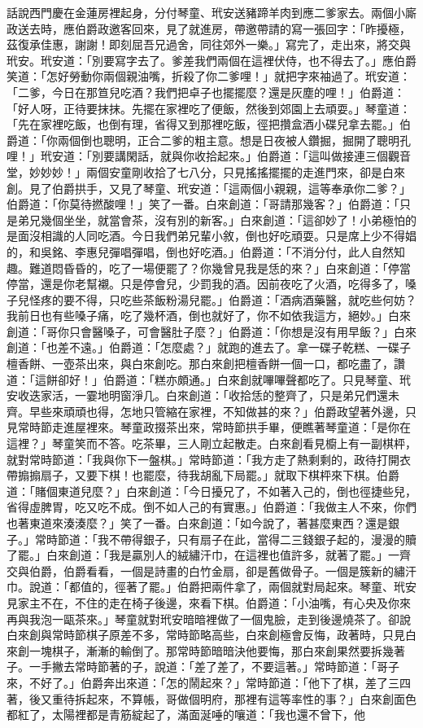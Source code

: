 \begin{showcontents}{}
話說西門慶在金蓮房裡起身，分付琴童、玳安送豬蹄羊肉到應二爹家去。兩個小廝政送去時，應伯爵政邀客回來，見了就進房，帶邀帶請的寫一張回字：「昨擾極，茲復承佳惠，謝謝！即刻屈吾兄過舍，同往郊外一樂。」寫完了，走出來，將交與玳安。玳安道：「別要寫字去了。爹差我們兩個在這裡伏侍，也不得去了。」應伯爵笑道：「怎好勞動你兩個親油嘴，折殺了你二爹哩！」就把字來袖過了。玳安道：「二爹，今日在那笪兒吃酒？我們把卓子也擺擺麼？還是灰塵的哩！」伯爵道：「好人呀，正待要抹抹。先擺在家裡吃了便飯，然後到郊園上去頑耍。」琴童道：「先在家裡吃飯，也倒有理，省得又到那裡吃飯，徑把攢盒酒小碟兒拿去罷。」伯爵道：「你兩個倒也聰明，正合二爹的粗主意。想是日夜被人鑽掘，掘開了聰明孔哩！」玳安道：「別要講閑話，就與你收拾起來。」伯爵道：「這叫做接連三個觀音堂，妙妙妙！」兩個安童剛收拾了七八分，只見搖搖擺擺的走進門來，卻是白來創。見了伯爵拱手，又見了琴童、玳安道：「這兩個小親親，這等奉承你二爹？」伯爵道：「你莫待撚酸哩！」笑了一番。白來創道：「哥請那幾客？」伯爵道：「只是弟兄幾個坐坐，就當會茶，沒有別的新客。」白來創道：「這卻妙了！小弟極怕的是面沒相識的人同吃酒。今日我們弟兄輩小敘，倒也好吃頑耍。只是席上少不得娼的，和吳銘、李惠兒彈唱彈唱，倒也好吃酒。」伯爵道：「不消分付，此人自然知趣。難道悶昏昏的，吃了一場便罷了？你幾曾見我是恁的來？」白來創道：「停當停當，還是你老幫襯。只是停會兒，少罰我的酒。因前夜吃了火酒，吃得多了，嗓子兒怪疼的要不得，只吃些茶飯粉湯兒罷。」伯爵道：「酒病酒藥醫，就吃些何妨？我前日也有些嗓子痛，吃了幾杯酒，倒也就好了，你不如依我這方，絕妙。」白來創道：「哥你只會醫嗓子，可會醫肚子麼？」伯爵道：「你想是沒有用早飯？」白來創道：「也差不遠。」伯爵道：「怎麼處？」就跑的進去了。拿一碟子乾糕、一碟子檀香餅、一壺茶出來，與白來創吃。那白來創把檀香餅一個一口，都吃盡了，讚道：「這餅卻好！」伯爵道：「糕亦頗通。」白來創就嗶嗶聲都吃了。只見琴童、玳安收迭家活，一霎地明窗淨几。白來創道：「收拾恁的整齊了，只是弟兄們還未齊。早些來頑頑也得，怎地只管縮在家裡，不知做甚的來？」伯爵政望著外邊，只見常時節走進屋裡來。琴童政掇茶出來，常時節拱手畢，便瞧著琴童道：「是你在這裡？」琴童笑而不答。吃茶畢，三人剛立起散走。白來創看見櫥上有一副棋枰，就對常時節道：「我與你下一盤棋。」常時節道：「我方走了熱剩剩的，政待打開衣帶搧搧扇子，又要下棋！也罷麼，待我胡亂下局罷。」就取下棋枰來下棋。伯爵道：「賭個東道兒麼？」白來創道：「今日擾兄了，不如著入己的，倒也徑捷些兒，省得虛脾胃，吃又吃不成。倒不如人己的有實惠。」伯爵道：「我做主人不來，你們也著東道來湊湊麼？」笑了一番。白來創道：「如今說了，著甚麼東西？還是銀子。」常時節道：「我不帶得銀子，只有扇子在此，當得二三錢銀子起的，漫漫的贖了罷。」白來創道：「我是贏別人的絨繡汗巾，在這裡也值許多，就著了罷。」一齊交與伯爵，伯爵看看，一個是詩畫的白竹金扇，卻是舊做骨子。一個是簇新的繡汗巾。說道：「都值的，徑著了罷。」伯爵把兩件拿了，兩個就對局起來。琴童、玳安見家主不在，不住的走在椅子後邊，來看下棋。伯爵道：「小油嘴，有心央及你來再與我泡一甌茶來。」琴童就對玳安暗暗裡做了一個鬼臉，走到後邊燒茶了。卻說白來創與常時節棋子原差不多，常時節略高些，白來創極會反悔，政著時，只見白來創一塊棋子，漸漸的輸倒了。那常時節暗暗決他要悔，那白來創果然要拆幾著子。一手撇去常時節著的子，說道：「差了差了，不要這著。」常時節道：「哥子來，不好了。」伯爵奔出來道：「怎的鬧起來？」常時節道：「他下了棋，差了三四著，後又重待拆起來，不算帳，哥做個明府，那裡有這等率性的事？」白來創面色都紅了，太陽裡都是青筋綻起了，滿面涎唾的嚷道：「我也還不曾下，他
\end{showcontents}

